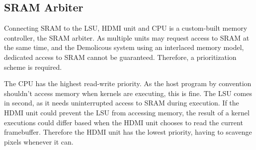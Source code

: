 \subsection{SRAM Arbiter}

Connecting SRAM to the LSU, HDMI unit and CPU is a custom-built memory controller, the SRAM arbiter.
As multiple units may request access to SRAM at the same time, and the Demolicous system using an interlaced memory model,
dedicated access to SRAM cannot be guaranteed.
Therefore, a prioritization scheme is required.

The CPU has the highest read-write priority.
As the host program by convention shouldn't access memory when kernels are executing, this is fine.
The LSU comes in second, as it needs uninterrupted access to SRAM during execution.
If the HDMI unit could prevent the LSU from accessing memory,
the result of a kernel executions could differ based when the HDMI unit chooses to read the current framebuffer.
Therefore the HDMI unit has the lowest priority, having to scavenge pixels whenever it can.
